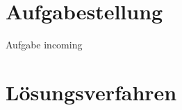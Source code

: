 \section{Aufgabestellung}
\huge
\begin{center}
    Aufgabe incoming
\end{center}


\pagebreak

\section{Lösungsverfahren}
